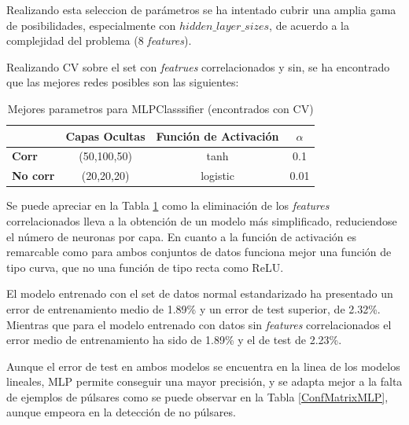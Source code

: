 \documentclass[a4paper]{article} %
\begin{document}
Realizando esta seleccion de parámetros se ha intentado cubrir una amplia gama de posibilidades, especialmente con $hidden\_layer\_sizes$, de acuerdo a la complejidad del problema (8 \textit{features}).\vspace{5mm}

Realizando CV sobre el set con \textit{featrues} correlacionados y sin, se ha encontrado que las mejores redes posibles son las siguientes:
\begin{table}[H]
\centering
\begin{tabular}{l|c|c|c|}
\cline{2-4}
 & \textbf{Capas Ocultas} & \textbf{Función de Activación} & \textbf{$\alpha$} \\ \hline
\multicolumn{1}{|l|}{\textbf{Corr}} & (50,100,50) & tanh & 0.1 \\ \hline
\multicolumn{1}{|l|}{\textbf{No corr}} & (20,20,20) & logistic & 0.01 \\ \hline
\end{tabular}
\caption{Mejores parametros para MLPClasssifier (encontrados con CV)}
\label{GridSearchMLPResults}
\end{table}

Se puede apreciar en la Tabla \ref{GridSearchMLPResults} como la eliminación de los \textit{features} correlacionados lleva a la obtención de un modelo más simplificado, reduciendose el número de neuronas por capa. En cuanto a la función de activación es remarcable como para ambos conjuntos de datos funciona mejor una función de tipo curva, que no una función de tipo recta como ReLU.\vspace{5mm}

El modelo entrenado con el set de datos normal estandarizado ha presentado un error de entrenamiento medio de 1.89\% y un error de test superior, de 2.32\%. Mientras que para el modelo entrenado con datos sin \textit{features} correlacionados el error medio de entrenamiento ha sido de 1.89\% y el de test de 2.23\%.\vspace{5mm}

Aunque el error de test en ambos modelos se encuentra en la linea de los modelos lineales, MLP permite conseguir una mayor precisión, y se adapta mejor a la falta de ejemplos de púlsares como se puede observar en la Tabla \ref{ConfMatrixMLP}, aunque empeora en la detección de no púlsares.
\end{document}
